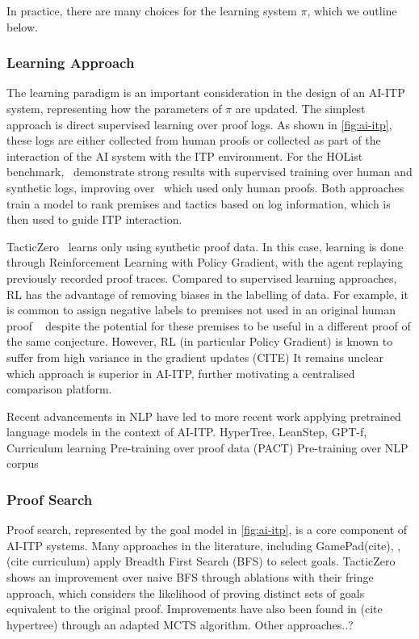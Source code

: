 \documentclass[letterpaper]{article} %
\begin{document}
    In practice, there are many choices for the learning system $\pi$, which we outline below.

    \subsubsection{Learning Approach}
    The learning paradigm is an important consideration in the design of an AI-ITP system, representing how the
    parameters of $\pi$ are updated.
    The simplest approach is direct supervised learning over proof logs.
    As shown in \ref{fig:ai-itp},
    these logs are either collected from human proofs or collected as part of the interaction of the AI system with the ITP environment.
    For the HOList benchmark,~\cite{bansal_learning_2019} demonstrate strong results with supervised training over human and synthetic logs,
    improving over~\cite{paliwal_graph_2019} which used only human proofs.
    Both approaches train a model to rank premises and tactics based on log information,
    which is then used to guide ITP interaction.

    TacticZero~\cite{wu_tacticzero_2021} learns only using synthetic proof data.
    In this case, learning is done through Reinforcement Learning with Policy Gradient,
    with the agent replaying previously recorded proof traces.
    Compared to supervised learning approaches, RL has the advantage of removing biases in the labelling of data.
    For example, it is common to assign negative labels to premises not used in an original human proof
    ~\cite{kaliszyk_holstep_2017, kaliszyk_mizar_2015, bansal_holist_2019}
    despite the potential for these premises to be useful in a different proof of the same conjecture.
    However, RL (in particular Policy Gradient) is known to suffer from high variance in the gradient updates (CITE)
    It remains unclear which approach is superior in AI-ITP, further motivating a centralised comparison platform.

    Recent advancements in NLP have led to more recent work applying pretrained language models in the context of AI-ITP.
    HyperTree, LeanStep, GPT-f, Curriculum learning
    Pre-training over proof data (PACT)
    Pre-training over NLP corpus

    \subsubsection{Proof Search}
    Proof search, represented by the goal model in \ref{fig:ai-itp}, is a core component of AI-ITP systems.
    Many approaches in the literature, including GamePad(cite), \cite{bansal_learning_2019}, (cite curriculum) apply Breadth First Search (BFS)
    to select goals. TacticZero \cite{wu_tacticzero_2021} shows an improvement over naive BFS through ablations with their fringe approach,
    which considers the likelihood of proving distinct sets of goals equivalent to the original proof.
    Improvements have also been found in (cite hypertree) through an adapted MCTS algorithm. Other approaches..?
\end{document}
